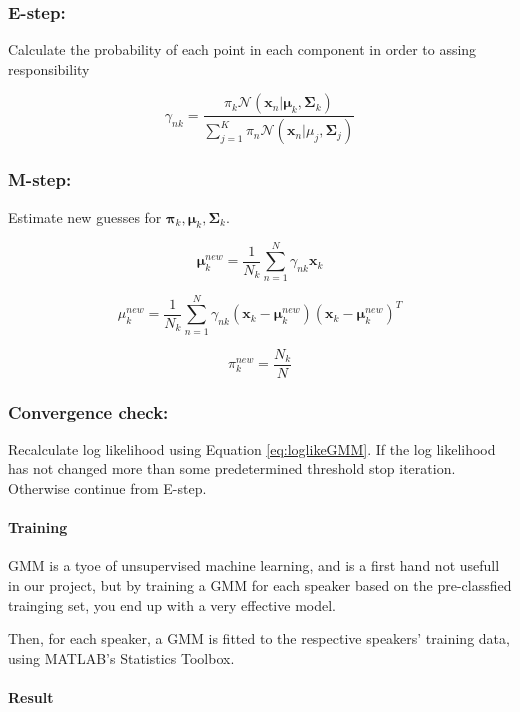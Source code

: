 \subsubsection*{E-step:}
Calculate the probability of each point in each component in order to assing responsibility

\begin{equation}
\gamma_{nk} = 
\frac
{\pi_{k}\mathcal{N}(\mathbf{x}_{n}|\mathbf{\mu}_{k},\mathbf{\Sigma}_{k})}
{\sum_{j=1}^{K} \pi_{n}\mathcal{N}(\mathbf{x}_{n}|\mu_{j},\mathbf{\Sigma}_{j})}
\end{equation}

\subsubsection*{M-step:}
Estimate new guesses for $ \mathbf{\pi}_{k}, \mathbf{\mu}_{k}, \mathbf{\Sigma}_{k} $.

\begin{equation}
\mathbf{\mu}_{k}^{new} = 
\frac{1}{N_{k}}
\sum_{n=1}^{N} 
\gamma_{nk}
\mathbf{x}_{k}
\end{equation}

\begin{equation}
\mu_{k}^{new} = 
\frac{1}{N_{k}}
\sum_{n=1}^{N} 
\gamma_{nk}
(\mathbf{x}_{k} - \mathbf{\mu}_{k}^{new})
(\mathbf{x}_{k} - \mathbf{\mu}_{k}^{new})^{T}
\end{equation}

\begin{equation}
\pi_{k}^{new} =
\frac
{N_{k}}
{N}
\end{equation}

\subsubsection*{Convergence check:}

Recalculate log likelihood using Equation \ref{eq:loglikeGMM}.
If the log likelihood has not changed more than some predetermined threshold stop iteration.
Otherwise continue from E-step.

\paragraph*{Training}
GMM is a tyoe of unsupervised machine learning, and is a first hand not usefull in our project, but by training a GMM for each speaker based on the pre-classfied trainging set, you end up with a very effective model.


Then, for each speaker, a GMM is fitted to the respective speakers' training data, using MATLAB's Statistics Toolbox.

\paragraph*{Result}
